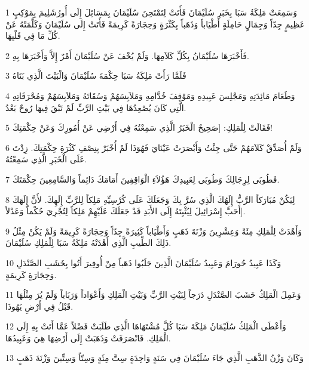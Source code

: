 \par 1 وَسَمِعَتْ مَلِكَةُ سَبَا بِخَبَرِ سُلَيْمَانَ فَأَتَتْ لِتَمْتَحِنَ سُلَيْمَانَ بِمَسَائِلَ إِلَى أُورُشَلِيمَ بِمَوْكِبٍ عَظِيمٍ جِدّاً وَجِمَالٍ حَامِلَةٍ أَطْيَاباً وَذَهَباً بِكَثْرَةٍ وَحِجَارَةً كَرِيمَةً فَأَتَتْ إِلَى سُلَيْمَانَ وَكَلَّمَتْهُ عَنْ كُلِّ مَا فِي قَلْبِهَا.
\par 2 فَأَخْبَرَهَا سُلَيْمَانُ بِكُلِّ كَلاَمِهَا. وَلَمْ يُخْفَ عَنْ سُلَيْمَانَ أَمْرٌ إِلاَّ وَأَخْبَرَهَا بِهِ.
\par 3 فَلَمَّا رَأَتْ مَلِكَةُ سَبَا حِكْمَةَ سُلَيْمَانَ وَالْبَيْتَ الَّذِي بَنَاهُ
\par 4 وَطَعَامَ مَائِدَتِهِ وَمَجْلِسَ عَبِيدِهِ وَمَوْقِفَ خُدَّامِهِ وَمَلاَبِسَهُمْ وَسُقَاتَهُ وَمَلاَبِسَهُمْ وَمُحْرَقَاتِهِ الَّتِي كَانَ يُصْعِدُهَا فِي بَيْتِ الرَّبِّ لَمْ تَبْقَ فِيهَا رُوحٌ بَعْدُ.
\par 5 فَقَالَتْ لِلْمَلِكِ: [صَحِيحٌ الْخَبَرُ الَّذِي سَمِعْتُهُ فِي أَرْضِي عَنْ أُمُورِكَ وَعَنْ حِكْمَتِكَ!
\par 6 وَلَمْ أُصَدِّقْ كَلاَمَهُمْ حَتَّى جِئْتُ وَأَبْصَرَتْ عَيْنَايَ فَهُوَذَا لَمْ أُخْبَرْ بِنِصْفِ كَثْرَةِ حِكْمَتِكَ. زِدْتَ عَلَى الْخَبَرِ الَّذِي سَمِعْتُهُ.
\par 7 فَطُوبَى لِرِجَالِكَ وَطُوبَى لِعَبِيدِكَ هَؤُلاَءِ الْوَاقِفِينَ أَمَامَكَ دَائِماً وَالسَّامِعِينَ حِكْمَتَكَ.
\par 8 لِيَكُنْ مُبَارَكاً الرَّبُّ إِلَهُكَ الَّذِي سُرَّ بِكَ وَجَعَلَكَ عَلَى كُرْسِيِّهِ مَلِكاً لِلرَّبِّ إِلَهِكَ. لأَنَّ إِلَهَكَ أَحَبَّ إِسْرَائِيلَ لِيُثْبِتَهُ إِلَى الأَبَدِ قَدْ جَعَلَكَ عَلَيْهِمْ مَلِكاً لِتُجْرِيَ حُكْماً وَعَدْلاً].
\par 9 وَأَهْدَتْ لِلْمَلِكِ مِئَةً وَعِشْرِينَ وَزْنَةَ ذَهَبٍ وَأَطْيَاباً كَثِيرَةً جِدّاً وَحِجَارَةً كَرِيمَةً وَلَمْ يَكُنْ مِثْلُ ذَلِكَ الطِّيبِ الَّذِي أَهْدَتْهُ مَلِكَةُ سَبَا لِلْمَلِكِ سُلَيْمَانَ.
\par 10 وَكَذَا عَبِيدُ حُورَامَ وَعَبِيدُ سُلَيْمَانَ الَّذِينَ جَلَبُوا ذَهَباً مِنْ أُوفِيرَ أَتُوا بِخَشَبِ الصَّنْدَلِ وَحِجَارَةٍ كَرِيمَةٍ.
\par 11 وَعَمِلَ الْمَلِكُ خَشَبَ الصَّنْدَلِ دَرَجاً لِبَيْتِ الرَّبِّ وَبَيْتِ الْمَلِكِ وَأَعْوَاداً وَرَبَاباً وَلَمْ يُرَ مِثْلُهَا قَبْلُ فِي أَرْضِ يَهُوذَا.
\par 12 وَأَعْطَى الْمَلِكُ سُلَيْمَانُ مَلِكَةَ سَبَا كُلَّ مُشْتَهَاهَا الَّذِي طَلَبَتْ فَضْلاً عَمَّا أَتَتْ بِهِ إِلَى الْمَلِكِ. فَانْصَرَفَتْ وَذَهَبَتْ إِلَى أَرْضِهَا هِيَ وَعَبِيدُهَا.
\par 13 وَكَانَ وَزْنُ الذَّهَبِ الَّذِي جَاءَ سُلَيْمَانَ فِي سَنَةٍ وَاحِدَةٍ سِتَّ مِئَةٍ وَسِتّاً وَسِتِّينَ وَزْنَةَ ذَهَبٍ
